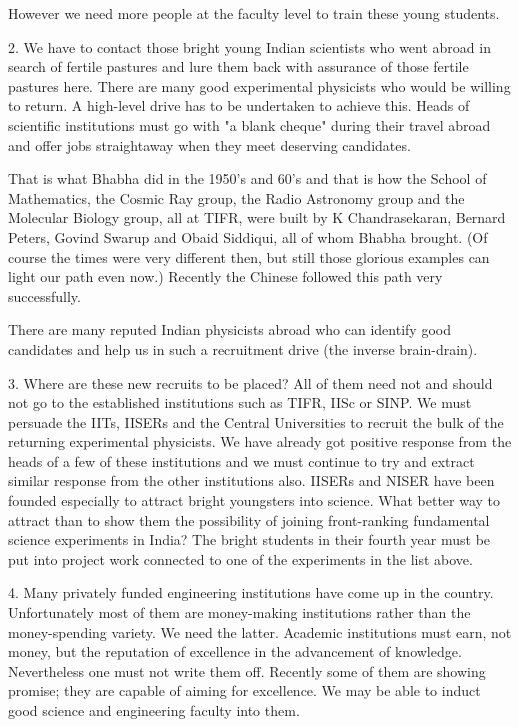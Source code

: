 However we need more people at the faculty level to train
these young students. 
  
2. We have to contact those bright young Indian scientists
who went abroad in search of fertile pastures and lure
them back with assurance of those fertile pastures here.
There are many good experimental physicists who would
be willing to return. A high-level drive has to be
undertaken to achieve this. Heads of scientific institutions 
must go with "a blank cheque" during their travel abroad and  
offer jobs straightaway when they meet deserving candidates.

That is what Bhabha did in the 1950's and 60's and that
is how the School of Mathematics, the Cosmic Ray
group, the Radio Astronomy group and the Molecular
Biology group, all at TIFR, were built by K Chandrasekaran,
Bernard Peters, Govind Swarup and Obaid Siddiqui, all of
whom Bhabha brought. (Of course the times were very
different then, but still those glorious examples can
light our path even now.) Recently the Chinese followed this
path very successfully.

There are many reputed Indian physicists abroad who can
identify good candidates and help us in such a recruitment
drive (the inverse brain-drain).

3. Where are these new recruits to be placed? All
of them need not and should not go to the established
institutions such as TIFR, IISc or SINP.
We must persuade the IITs, IISERs and the Central
Universities to recruit the bulk of the returning
experimental physicists. We have already got positive
response from the heads of a few of these institutions
and we must continue to try and extract similar response
from the other institutions also. IISERs and NISER
have been founded especially to attract bright youngsters
into science. What better way to attract than to show
them the possibility of joining front-ranking
fundamental science experiments in India? The bright
students in their fourth year must be put into
project work connected to one of the experiments in
the list above.

4. Many privately funded engineering institutions have come up
in the country. Unfortunately most of them are money-making
institutions rather than the money-spending variety. We need
the latter. Academic institutions must earn, not money, but
the reputation of excellence in the advancement of knowledge. 
Nevertheless one must not write them off. Recently
some of them are showing promise; they are capable
of aiming for excellence. We may be able to induct good 
science and engineering faculty into them.

